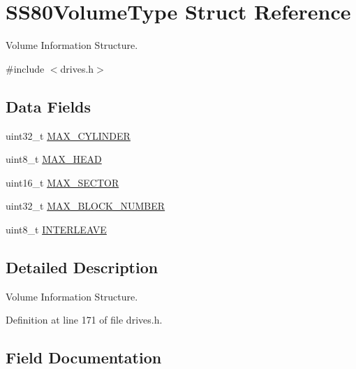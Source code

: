 \hypertarget{structSS80VolumeType}{}\section{S\+S80\+Volume\+Type Struct Reference}
\label{structSS80VolumeType}


Volume Information Structure.  




{\ttfamily \#include $<$drives.\+h$>$}

\subsection*{Data Fields}
\begin{DoxyCompactItemize}
\item 
uint32\+\_\+t \hyperlink{structSS80VolumeType_a53b65739246cea4e0d9095c88b03be8e}{M\+A\+X\+\_\+\+C\+Y\+L\+I\+N\+D\+ER}
\item 
uint8\+\_\+t \hyperlink{structSS80VolumeType_acc2870eb0a52a0e7f4dc57f036d903b1}{M\+A\+X\+\_\+\+H\+E\+AD}
\item 
uint16\+\_\+t \hyperlink{structSS80VolumeType_a0a367b3bf05801cdee9dadc8324a3bdb}{M\+A\+X\+\_\+\+S\+E\+C\+T\+OR}
\item 
uint32\+\_\+t \hyperlink{structSS80VolumeType_afe3db69c9ec54fa6d9fd48f3e6e9097b}{M\+A\+X\+\_\+\+B\+L\+O\+C\+K\+\_\+\+N\+U\+M\+B\+ER}
\item 
uint8\+\_\+t \hyperlink{structSS80VolumeType_accc9f011ff8edebcc6d781d1aa51f16d}{I\+N\+T\+E\+R\+L\+E\+A\+VE}
\end{DoxyCompactItemize}


\subsection{Detailed Description}
Volume Information Structure. 

Definition at line 171 of file drives.\+h.



\subsection{Field Documentation}
\mbox{\label{structSS80VolumeType_accc9f011ff8edebcc6d781d1aa51f16d}} 
